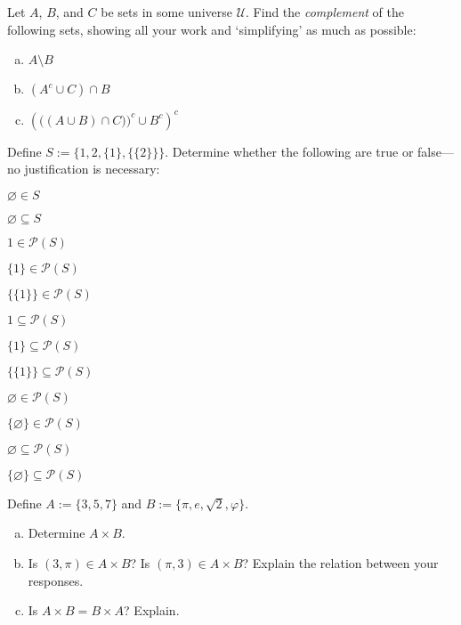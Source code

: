 \documentclass[11pt,letterpaper]{article}
\begin{document}
 Let $A$, $B$, and $C$ be sets in some universe $\mathcal{U}$. Find the \textit{complement} of the following sets, showing all your work and `simplifying' as much as possible:
	\begin{enumerate}[(a)]
	\item $A \setminus B$
	\item $(A^c \cup C) \cap B$
	\item $\left( \big( (A \cup B) \cap C) \big)^c \cup B^c \right)^c$
	\end{enumerate}



\newpage



 Define $S:= \{ 1, 2, \{ 1 \}, \{ \{ 2 \} \} \}$. Determine whether the following are true or false---no justification is necessary:
	\begin{2enumerate}
	\item $\varnothing \in S$
	\item $\varnothing \subseteq S$
	\item $1 \in \mathcal{P}(S)$
	\item $\{ 1 \} \in \mathcal{P}(S)$
	\item $\{ \{ 1 \} \} \in \mathcal{P}(S)$
	\item $1 \subseteq \mathcal{P}(S)$
	\item $\{ 1 \} \subseteq \mathcal{P}(S)$
	\item $\{ \{ 1 \} \} \subseteq \mathcal{P}(S)$
	\item $\varnothing \in \mathcal{P}(S)$
	\item $\{ \varnothing \} \in \mathcal{P}(S)$
	\item $\varnothing \subseteq \mathcal{P}(S)$
	\item $\{ \varnothing \} \subseteq \mathcal{P}(S)$
	\end{2enumerate}



\newpage



 Define $A:= \{ 3, 5, 7 \}$ and $B:= \{ \pi, e, \sqrt{2}, \varphi \}$. 
	\begin{enumerate}[(a)]
	\item Determine $A \times B$.
	\item Is $(3, \pi) \in A \times B$? Is $(\pi, 3) \in A \times B$? Explain the relation between your responses. 
	\item Is $A \times B= B \times A$? Explain. 
	\end{enumerate}
\end{document}
